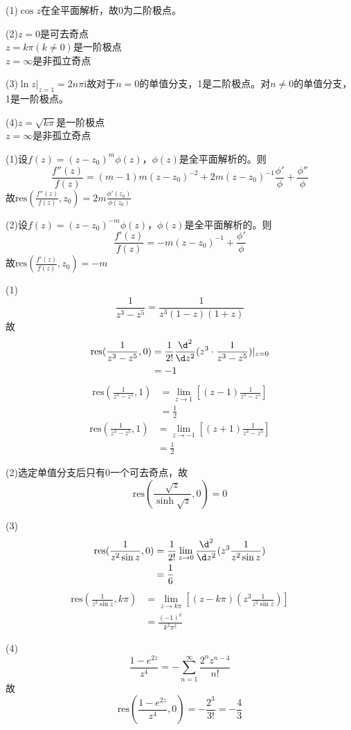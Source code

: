 \documentclass{phyasgn}
\renewcommand{\i}{\mathrm{i}}
\newcommand{\res}{\text{res}}
\begin{document}
\begin{sol}[4]
    (1)$\cos z$在全平面解析，故$0$为二阶极点。

    (2)$z=0$是可去奇点\\
    $z=k\pi(k\neq 0)$是一阶极点\\
    $z=\infty$是非孤立奇点

    (3)$\ln z|_{z=1}=2n\pi \i$故对于$n=0$的单值分支，1是二阶极点。对$n\neq 0$的单值分支，1是一阶极点。

    (4)$z=\sqrt{k\pi}$是一阶极点\\
    $z=\infty$是非孤立奇点
\end{sol}\par

\begin{sol}[5]
    (1)设$f(z)=(z-z_0)^m\phi(z)$，$\phi(z)$是全平面解析的。则
     $$\frac{f''(z)}{f(z)}=(m-1)m(z-z_0)^{-2}+2m(z-z_0)^{-1}\frac{\phi'}{\phi}+\frac{\phi''}{\phi} $$
    故$\res(\frac{f''(z)}{f(z)},z_0)=2m\frac{\phi'(z_0)}{\phi(z_0)}$

    (2)设$f(z)=(z-z_0)^{-m}\phi(z)$，$\phi(z)$是全平面解析的。则
     $$\frac{f'(z)}{f(z)}=-m(z-z_0)^{-1}+\frac{\phi'}{\phi} $$
    故$\res(\frac{f'(z)}{f(z)},z_0)=-m$
\end{sol}\par

\begin{sol}[6]
    (1)$$ \frac{1}{z^3-z^5}=\frac{1}{z^3(1-z)(1+z)} $$
    故 \begin{align*}
        \res(\frac{1}{z^3-z^5},0)&=\frac{1}{2!}\frac{\d^2}{\d z^2}(z^3\cdot\frac{1}{z^3-z^5})|_{z=0}\\
        &=-1
    \end{align*} 
     \begin{align*}
        \res(\frac{1}{z^3-z^5},1)&=\lim\limits_{z\to1}[(z-1)\frac{1}{z^3-z^5}]\\
        &=\frac{1}{2}
    \end{align*} 
     \begin{align*}
        \res(\frac{1}{z^3-z^5},1)&=\lim\limits_{z\to-1}[(z+1)\frac{1}{z^3-z^5}]\\
        &=\frac{1}{2}
    \end{align*} 

    (2)选定单值分支后只有$0$一个可去奇点，故
     $$\res(\frac{\sqrt{z}}{\sinh\sqrt{z}},0)=0 $$

    (3) \begin{align*}
        \res(\frac{1}{z^2\sin z},0)&=\frac{1}{2!}\lim\limits_{z\to 0}\frac{\d^2}{\d z^2}(z^3\frac{1}{z^2\sin z})\\
        &=\frac{1}{6}
    \end{align*} 
     \begin{align*}
        \res(\frac{1}{z^2\sin z},k\pi)&=\lim\limits_{z\to k\pi}[(z-k\pi)(z^3\frac{1}{z^2\sin z})]\\
        &=\frac{(-1)^k}{k^2\pi^2}
    \end{align*} 

    (4) $$\frac{1-e^{2z}}{z^4}=-\sum_{n=1}^{\infty}\frac{2^nz^{n-4}}{n!} $$
    故 $$\res(\frac{1-e^{2z}}{z^4},0)=-\frac{2^3}{3!}=-\frac{4}{3} $$
\end{sol}\par
\end{document}
